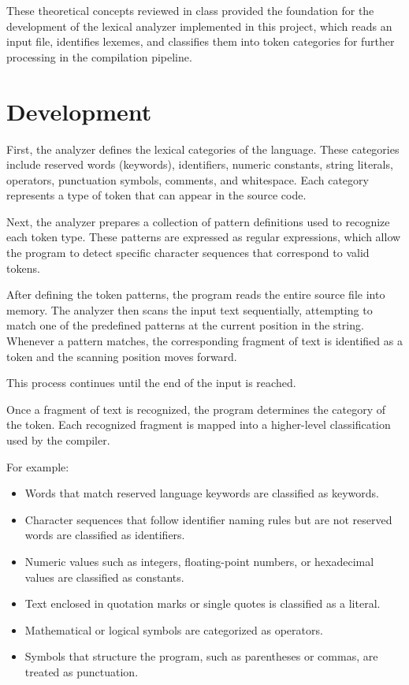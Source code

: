\documentclass[letterpaper,12pt,oneside]{article}
\begin{document}
These theoretical concepts reviewed in class provided the foundation for the development of the lexical analyzer implemented in this project, which reads an input file, identifies lexemes, and classifies them into token categories for further processing in the compilation pipeline.


\section{Development}


First, the analyzer defines the lexical categories of the language. These categories include reserved words (keywords), identifiers, numeric constants, string literals, operators, punctuation symbols, comments, and whitespace. Each category represents a type of token that can appear in the source code.

Next, the analyzer prepares a collection of pattern definitions used to recognize each token type. These patterns are expressed as regular expressions, which allow the program to detect specific character sequences that correspond to valid tokens.

After defining the token patterns, the program reads the entire source file into memory. The analyzer then scans the input text sequentially, attempting to match one of the predefined patterns at the current position in the string. Whenever a pattern matches, the corresponding fragment of text is identified as a token and the scanning position moves forward.

This process continues until the end of the input is reached.

Once a fragment of text is recognized, the program determines the category of the token. Each recognized fragment is mapped into a higher-level classification used by the compiler.

For example:

\begin{itemize}
\item Words that match reserved language keywords are classified as keywords.
\item Character sequences that follow identifier naming rules but are not reserved words are classified as identifiers.
\item Numeric values such as integers, floating-point numbers, or hexadecimal values are classified as constants.
\item Text enclosed in quotation marks or single quotes is classified as a literal.
\item Mathematical or logical symbols are categorized as operators.
\item Symbols that structure the program, such as parentheses or commas, are treated as punctuation.
\end{itemize}
\end{document}
